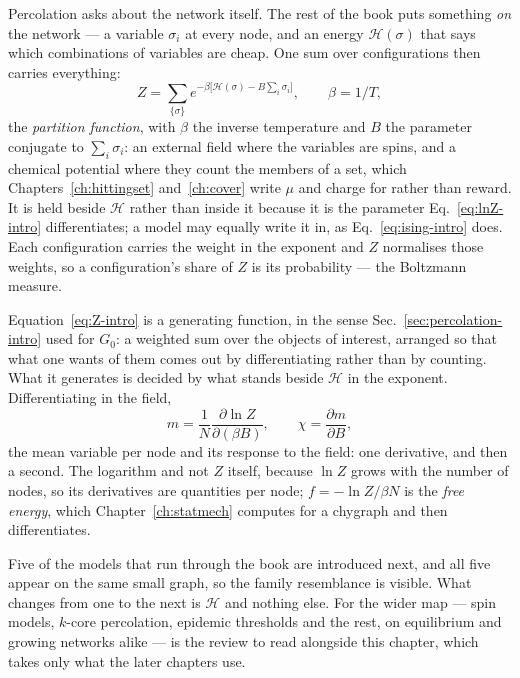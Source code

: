 Percolation asks about the network itself. The rest of the book puts something
\emph{on} the network --- a variable $\sigma_{i}$ at every node, and an energy
$\mathcal{H}(\sigma)$ that says which combinations of variables are cheap. One
sum over configurations then carries everything:
\begin{equation}
  Z=\sum_{\{\sigma\}}
    e^{-\beta\bigl[\mathcal{H}(\sigma)-B\sum_{i}\sigma_{i}\bigr]},
  \qquad
  \beta=1/T,
  \label{eq:Z-intro}
\end{equation}
the \emph{partition function}, with $\beta$ the inverse temperature and $B$ the
parameter conjugate to $\sum_{i}\sigma_{i}$: an external field where the
variables are spins, and a chemical potential where they count the members of a
set, which Chapters~\ref{ch:hittingset} and~\ref{ch:cover} write $\mu$ and
charge for rather than reward. It is held beside $\mathcal{H}$ rather than
inside it because it is the parameter Eq.~\eqref{eq:lnZ-intro} differentiates;
a model may equally write it in, as Eq.~\eqref{eq:ising-intro} does. Each
configuration carries the weight in the exponent and $Z$ normalises those
weights, so a configuration's share of $Z$ is its probability --- the Boltzmann
measure.

Equation~\eqref{eq:Z-intro} is a generating function, in the sense
Sec.~\ref{sec:percolation-intro} used for $G_{0}$: a weighted sum over the
objects of interest, arranged so that what one wants of them comes out by
differentiating rather than by counting. What it generates is decided by what
stands beside $\mathcal{H}$ in the exponent. Differentiating in the field,
\begin{equation}
  m=\frac{1}{N}\frac{\partial\ln Z}{\partial(\beta B)},
  \qquad
  \chi=\frac{\partial m}{\partial B},
  \label{eq:lnZ-intro}
\end{equation}
the mean variable per node and its response to the field: one derivative, and
then a second. The logarithm and not $Z$ itself, because $\ln Z$ grows with the
number of nodes, so its derivatives are quantities per node; $f=-\ln Z/\beta N$
is the \emph{free energy}, which Chapter~\ref{ch:statmech} computes for a
chygraph and then differentiates.

Five of the models that run through the book are introduced next, and all five
appear on the same small graph, so the family resemblance is visible. What
changes from one to the next is $\mathcal{H}$ and nothing else. For the wider
map --- spin models, $k$-core percolation, epidemic
thresholds and the rest, on equilibrium and growing networks alike ---
\citet{dorogovtsev2008} is the review to read alongside this chapter, which
takes only what the later chapters use.

